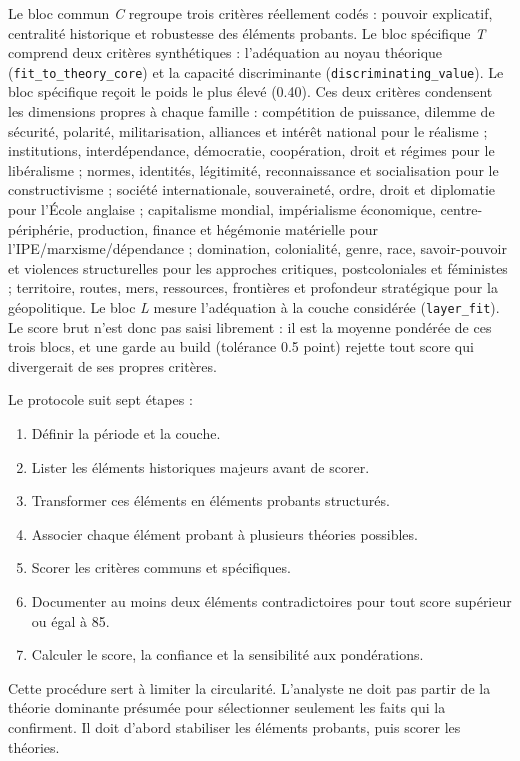 \documentclass[11pt,a4paper]{article}
\begin{document}
Le bloc commun \emph{C} regroupe trois critères réellement codés : pouvoir explicatif, centralité historique et robustesse des éléments probants. Le bloc spécifique \emph{T} comprend deux critères synthétiques : l'adéquation au noyau théorique (\texttt{fit\_to\_theory\_core}) et la capacité discriminante (\texttt{discriminating\_value}). Le bloc spécifique reçoit le poids le plus élevé (0.40). Ces deux critères condensent les dimensions propres à chaque famille : compétition de puissance, dilemme de sécurité, polarité, militarisation, alliances et intérêt national pour le réalisme ; institutions, interdépendance, démocratie, coopération, droit et régimes pour le libéralisme ; normes, identités, légitimité, reconnaissance et socialisation pour le constructivisme ; société internationale, souveraineté, ordre, droit et diplomatie pour l'École anglaise ; capitalisme mondial, impérialisme économique, centre-périphérie, production, finance et hégémonie matérielle pour l'IPE/marxisme/dépendance ; domination, colonialité, genre, race, savoir-pouvoir et violences structurelles pour les approches critiques, postcoloniales et féministes ; territoire, routes, mers, ressources, frontières et profondeur stratégique pour la géopolitique. Le bloc \emph{L} mesure l'adéquation à la couche considérée (\texttt{layer\_fit}). Le score brut n'est donc pas saisi librement : il est la moyenne pondérée de ces trois blocs, et une garde au build (tolérance 0.5 point) rejette tout score qui divergerait de ses propres critères.

Le protocole suit sept étapes :

\begin{enumerate}
\item Définir la période et la couche.
\item Lister les éléments historiques majeurs avant de scorer.
\item Transformer ces éléments en éléments probants structurés.
\item Associer chaque élément probant à plusieurs théories possibles.
\item Scorer les critères communs et spécifiques.
\item Documenter au moins deux éléments contradictoires pour tout score supérieur ou égal à 85.
\item Calculer le score, la confiance et la sensibilité aux pondérations.
\end{enumerate}

Cette procédure sert à limiter la circularité. L'analyste ne doit pas partir de la théorie dominante présumée pour sélectionner seulement les faits qui la confirment. Il doit d'abord stabiliser les éléments probants, puis scorer les théories.
\end{document}
